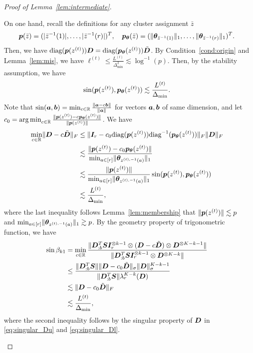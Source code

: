 \documentclass[lettersize,onecolumn,journal]{IEEEtran}
\theoremstyle{definition}
\theoremstyle{definition}
\begin{document}
\begin{proof}[Proof of Lemma~\ref{lem:intermediate}]
\begin{enumerate}
    On one hand, recall the definitions for any cluster assignment $\bar z$
    \begin{equation}
        \bm{p}(\bar z)=(|\bar z^{-1}(1)|, \ldots,|\bar z^{-1}(r)|)^T,\quad \bm{p}_{\boldsymbol{\theta}}(\bar z)=(\lVert\boldsymbol{\theta}_{\bar z^{-1}(1)}\rVert_1,\ldots,\lVert\boldsymbol{\theta}_{\bar z^{-1}(r)}\rVert_1)^T.
    \end{equation}
    Then, we have $\text{diag}(\bm{p}(z^{(t)})) \bm{D} = \text{diag}(\bm{p}_{\boldsymbol{\theta}}(z^{(t)})) \tilde {\bm{D}}$. By Condition~\ref{cond:origin} and Lemma~\ref{lem:mis}, we have $\ell^{(t)} \leq \frac{L^{(t)}}{\Delta_{\min}^2} \lesssim \log^{-1}(p) $. Then, by the stability assumption, we have 
    \begin{equation}
         \sin (\bm{p}(z^{(t)}), \bm{p}_{\boldsymbol{\theta}}(z^{(t)})) \lesssim \frac{L^{(t)}}{\Delta_{\min}}. 
    \end{equation}
    Note that $\sin(\bm{a},\bm{b}) =\min_{c \in \mathbb{R}} \frac{ \lVert\bm{a} - c\bm{b}\rVert }{\lVert\bm{a}\rVert}$ for vectors $\bm{a},\bm{b}$ of same dimension, and let $c_0 = \operatorname*{arg\,min}_{c \in \mathbb{R}} \frac{\lVert\bm{p}(z^{(t)}) - c\bm{p}_{\boldsymbol{\theta}}(z^{(t)})\rVert}{\lVert\bm{p}(z^{(t)})\rVert}$. We have
    \begin{align}
       \min_{c \in \mathbb{R}} \lVert \bm{D} - c \tilde {\bm{D}}\rVert_F &\leq  \lVert \bm I_r - c_0 \text{diag}(\bm{p}(z^{(t)})) \text{diag}^{-1}(\bm{p}_{\boldsymbol{\theta}}(z^{(t)}))\rVert_F \lVert\bm{D}\rVert_F\\
       &\lesssim \frac{ \lVert \bm{p}(z^{(t)}) - c_0\bm{p}_{\boldsymbol{\theta}}(z^{(t)})\rVert }{\min_{a \in [r]} \lVert\boldsymbol{\theta}_{z^{(t),-1}(a)} \rVert_1  } \\
       & \lesssim \frac{\lVert \bm{p}(z^{(t)})\rVert }{\min_{a \in [r]} \lVert\boldsymbol{\theta}_{z^{(t),-1}(a)} \rVert_1 } \sin (\bm{p}(z^{(t)}), \bm{p}_{\boldsymbol{\theta}}(z^{(t)}))\\
       & \lesssim \frac{L^{(t)}}{\Delta_{\min}},
    \end{align}
    where the last inequality follows Lemma~\ref{lem:membership} that $\lVert \bm{p}(z^{(t)})\rVert \lesssim p$ and $\min_{a \in [r]} \lVert\boldsymbol{\theta}_{z^{(t),-1}(a)} \rVert_1  \gtrsim p$. By the geometry property of trigonometric function, we have
    \begin{align}
        \sin \beta_{k1} &= \min_{c \in \mathbb{R}} \frac{\lVert\bm{D}_{:b}^{T} \bm S \bm I_r^{\otimes k-1} \otimes (\bm{D} - c \tilde {\bm{D}}) \otimes \bm{D}^{\otimes K-k - 1} \rVert }{ \lVert\bm{D}_{:b}^{T} \bm S \bm I_r^{\otimes k-1} \otimes \bm{D}^{\otimes K-k}\rVert }\\
        &\leq \frac{ \lVert\bm{D}_{:b}^{T} \bm S\rVert \lVert\bm{D} - c_0 \tilde {\bm{D}}\rVert_{\sigma} \lVert\bm{D}\rVert_{\sigma}^{K-k-1} }{\lVert\bm{D}_{:b}^{T} \bm S\rVert \lambda_r^{K-k}(\bm{D}) }\\
        & \lesssim  \lVert\bm{D} - c_0 \tilde {\bm{D}}\rVert_{F}\\
        & \lesssim \frac{L^{(t)}}{\Delta_{\min}},
    \end{align}
    where the second inequality follows by the singular property of $\bm{D}$ in \eqref{eq:singular_Du} and \eqref{eq:singular_Dl}.
    

\end{enumerate}
\end{proof}
\end{document}
